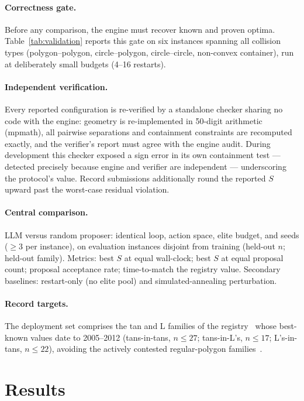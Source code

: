\documentclass[pdflatex,sn-mathphys-num]{sn-jnl}
\theoremstyle{thmstyleone}%
\begin{document}
\paragraph{Correctness gate.} Before any comparison, the engine must recover
known and proven optima. Table~\ref{tab:validation} reports this gate on six
instances spanning all collision types (polygon--polygon, circle--polygon,
circle--circle, non-convex container), run at deliberately small budgets
(4--16 restarts).

\paragraph{Independent verification.} Every reported configuration is
re-verified by a standalone checker sharing no code with the engine:
geometry is re-implemented in 50-digit arithmetic (mpmath), all pairwise
separations and containment constraints are recomputed exactly, and the
verifier's report must agree with the engine audit. During development this
checker exposed a sign error in its own containment test --- detected
precisely because engine and verifier are independent --- underscoring the
protocol's value. Record submissions additionally round the reported $S$
upward past the worst-case residual violation.

\paragraph{Central comparison.} LLM versus random proposer: identical loop,
action space, elite budget, and seeds ($\ge 3$ per instance), on evaluation
instances disjoint from training (held-out $n$; held-out family). Metrics:
best $S$ at equal wall-clock; best $S$ at equal proposal count; proposal
acceptance rate; time-to-match the registry value. Secondary baselines:
restart-only (no elite pool) and simulated-annealing perturbation.

\paragraph{Record targets.} The deployment set comprises the tan and L
families of the registry~\cite{friedman2009survey} whose best-known values
date to 2005--2012 (tans-in-tans, $n \le 27$; tans-in-L's, $n \le 17$;
L's-in-tans, $n \le 22$), avoiding the actively contested regular-polygon
families~\cite{vallejo2026packer}.

\section{Results}\label{sec:results}
\end{document}
